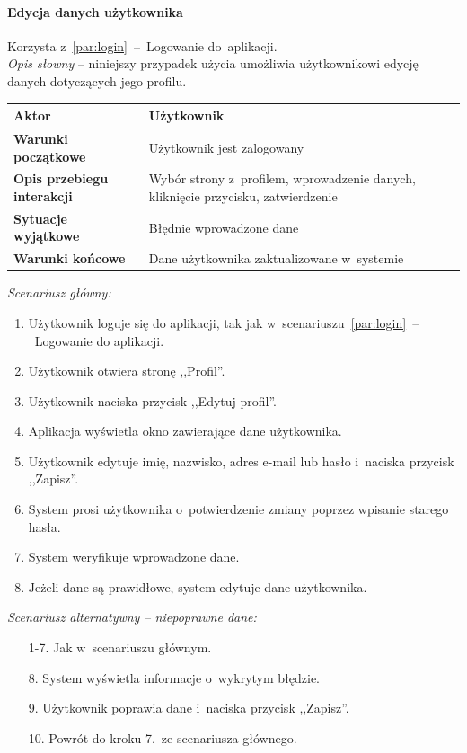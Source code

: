 \paragraph{Edycja danych użytkownika\newline}
\label{par:editUser}
Korzysta z~\ref{par:login}~--~Logowanie do~aplikacji.\\

\textit{Opis słowny} -- niniejszy przypadek użycia umożliwia użytkownikowi edycję danych dotyczących jego profilu.

\begin{longtable}{|p{5cm}|p{7cm}|}
  \hline \textbf{Aktor} & Użytkownik \\ \hline
  \textbf{Warunki początkowe} & Użytkownik jest zalogowany \\ \hline
  \textbf{Opis przebiegu interakcji} & Wybór strony z~profilem, wprowadzenie danych, kliknięcie przycisku, zatwierdzenie \\ \hline
  \textbf{Sytuacje wyjątkowe} & Błędnie wprowadzone dane \\ \hline
  \textbf{Warunki końcowe} & Dane użytkownika zaktualizowane w~systemie \\ \hline
\end{longtable}

\noindent \textit{Scenariusz główny:}
\begin{enumerate}
  \item Użytkownik loguje się do aplikacji, tak jak w~scenariuszu~\ref{par:login}~--~Logowanie do aplikacji.
  \item Użytkownik otwiera stronę ,,Profil''.
  \item Użytkownik naciska przycisk ,,Edytuj profil''.
  \item Aplikacja wyświetla okno zawierające dane użytkownika.
  \item Użytkownik edytuje imię, nazwisko, adres e-mail lub hasło i~naciska przycisk ,,Zapisz''.
  \item System prosi użytkownika o~potwierdzenie zmiany poprzez wpisanie starego hasła.
  \item System weryfikuje wprowadzone dane.
  \item Jeżeli dane są prawidłowe, system edytuje dane użytkownika.
\end{enumerate}

\noindent \textit{Scenariusz alternatywny -- niepoprawne dane:}
\begin{enumerate}
  \item[1-7.] Jak w~scenariuszu głównym.
  \item[8.] System wyświetla informacje o~wykrytym błędzie.
  \item[9.] Użytkownik poprawia dane i~naciska przycisk ,,Zapisz''.
  \item[10.] Powrót do kroku 7.~ze scenariusza głównego.
\end{enumerate}

